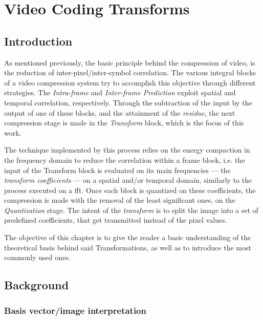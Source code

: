 \cleardoublepage
\chapter{Video Coding Transforms}

\section{{Introduction}}

As mentioned previously, the basic principle behind the compression of video, is the reduction of inter-pixel/inter-symbol correlation. The various integral blocks of a video compression system try to accomplish this objective through different strategies. The \emph{Intra-frame} and \emph{Inter-frame Prediction} exploit spatial and temporal correlation, respectively. Through the subtraction of the input by the output of one of these blocks, and the attainment of the \emph{residue}, the next compression stage is made in the \emph{Transform} block, which is the focus of this work.

The technique implemented by this process relies on the energy compaction in the frequency domain to reduce the correlation within a frame block, i.e. the input of the Transform block is evaluated on its main frequencies --- the \emph{transform coefficients} --- on a spatial and/or temporal domain, similarly to the process executed on a \gls{fft}. Once each block is quantized on these coefficients, the compression is made with the removal of the least significant ones, on the \emph{Quantization} stage. The intent of the \emph{transform} is to split the image into a set of predefined coefficients, that get transmitted instead of the pixel values.

The objective of this chapter is to give the reader a basic understanding of the theoretical basis behind said Transformations, as well as to introduce the most commonly used ones. 

\section{Background}
\subsection{Basis vector/image interpretation}

